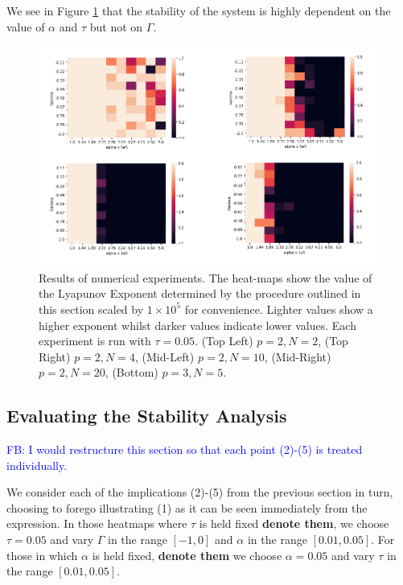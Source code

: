 \documentclass[sigconf,anonymous]{aamas}
\newcommand\fb[1]{\textcolor{blue}{FB: #1}}
\begin{document}
We see in Figure \ref{fig:NumericalExperiments} that the stability of the system is highly dependent on
the value of $\alpha$ and $\tau$ but not on $\Gamma$.
   
\begin{figure}[t]
    \centering
    \includegraphics[width = 0.9 \linewidth]{Figures/Experiments.png}
    \caption{Results of numerical experiments. The heat-maps show the value of the Lyapunov Exponent determined by the procedure outlined in this section scaled by $1 \times 10^5$ for convenience. Lighter values show a higher exponent whilst darker values indicate lower values. Each experiment is run with $\tau = 0.05$. (Top Left) $p = 2, N = 2$, (Top Right) $p = 2, N = 4$, (Mid-Left) $p = 2, N = 10$, (Mid-Right) $p = 2, N = 20$, (Bottom) $p = 3, N = 5$.}
    \label{fig:NumericalExperiments}
\end{figure}

\subsection{Evaluating the Stability Analysis}

\fb{I would restructure this section so that each point (2)-(5) is treated individually.}

We consider each of the implications (2)-(5) from the previous section
in turn, choosing to forego illustrating (1) as it can be seen immediately
from the expression. In those heatmaps where $\tau$ is held fixed
\textbf{denote them}, we choose $\tau = 0.05 $ and vary $\Gamma$ in
the range $[-1, 0]$ and $\alpha$ in the range $[0.01, 0.05]$. For
those in which $\alpha$ is held fixed, \textbf{denote them} we choose
$\alpha = 0.05$ and vary $\tau$ in the range $[0.01, 0.05]$.
\end{document}
